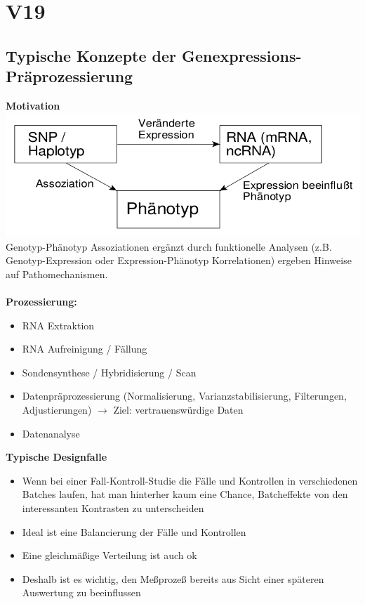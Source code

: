 \section{V19}
\subsection{Typische Konzepte der Genexpressions-Präprozessierung}
\textbf{Motivation}\\
\includegraphics[width=1.00\textwidth]{lectures/V19/pix/pic1.png}
Genotyp-Phänotyp Assoziationen ergänzt durch funktionelle Analysen (z.B. Genotyp-Expression oder Expression-Phänotyp Korrelationen) ergeben Hinweise auf Pathomechanismen.
\\\\
\textbf{Prozessierung:}
\begin{itemize}
	\item RNA Extraktion
	\item RNA Aufreinigung / Fällung
	\item Sondensynthese / Hybridisierung / Scan
	\item Datenpräprozessierung (Normalisierung, Varianzstabilisierung, Filterungen, Adjustierungen) $\rightarrow$ Ziel: vertrauenswürdige Daten
	\item Datenanalyse
\end{itemize}

\textbf{Typische Designfalle}
\begin{itemize}
	\item Wenn bei einer Fall-Kontroll-Studie die Fälle und Kontrollen in verschiedenen Batches laufen, hat man hinterher kaum eine Chance, Batcheffekte von den interessanten Kontrasten zu unterscheiden
	\item Ideal ist eine Balancierung der Fälle und Kontrollen
	\item Eine gleichmäßige Verteilung ist auch ok
	\item Deshalb ist es wichtig, den Meßprozeß bereits aus Sicht einer späteren Auswertung zu beeinflussen
\end{itemize}


